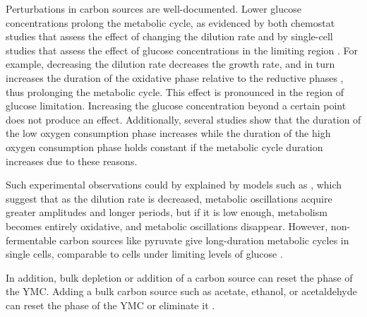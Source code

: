 Perturbations in carbon sources are well-documented.
Lower glucose concentrations prolong the metabolic cycle, as evidenced by both chemostat studies that assess the effect of changing the dilution rate \parencite{burnettiCellCycleStart2016, oneillEukaryoticCellBiology2020} and by single-cell studies that assess the effect of glucose concentrations in the limiting region \parencite{papagiannakisAutonomousMetabolicOscillations2017}.
For example, decreasing the dilution rate decreases the growth rate, and in turn increases the duration of the oxidative phase relative to the reductive phases \parencite{slavovCouplingGrowthRate2011}, thus prolonging the metabolic cycle.
This effect is pronounced in the region of glucose limitation.
Increasing the glucose concentration beyond a certain point does not produce an effect.
Additionally, several studies \parencite{slavovCouplingGrowthRate2011,oneillEukaryoticCellBiology2020} show that the duration of the low oxygen consumption phase increases while the duration of the high oxygen consumption phase holds constant if the metabolic cycle duration increases due to these reasons.

Such experimental observations could by explained by models such as \textcite{jonesCyberneticModelGrowth1999}, which suggest that as the dilution rate is decreased, metabolic oscillations acquire greater amplitudes and longer periods, but if it is low enough, metabolism becomes entirely oxidative, and metabolic oscillations disappear.
However, non-fermentable carbon sources like pyruvate give long-duration metabolic cycles in single cells, comparable to cells under limiting levels of glucose \parencite{papagiannakisAutonomousMetabolicOscillations2017}.

In addition, bulk depletion or addition of a carbon source can reset the phase of the YMC.
Adding a bulk carbon source such as acetate, ethanol, or acetaldehyde can reset the phase of the YMC \parencite{kuangMsn2RegulateExpression2017, krishnaMinimalPushPull2018} or eliminate it \parencite{jonesCyberneticModelGrowth1999}.

